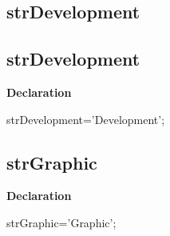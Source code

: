 \documentclass{report}
\newif\ifpdf
\begin{document}
\subsection*{\large{\textbf{strDevelopment}}\normalsize\hspace{1ex}\hrulefill}
\else
\subsection*{strDevelopment}
\fi
\label{trstrings-strDevelopment}
\begin{list}{}{
\setlength{\itemindent}{0cm}
\setlength{\listparindent}{0cm}
\setlength{\leftmargin}{\evensidemargin}
\addtolength{\leftmargin}{\tmplength}
\settowidth{\labelsep}{X}
\addtolength{\leftmargin}{\labelsep}
\setlength{\labelwidth}{\tmplength}
}
\item[\textbf{Declaration}\hfill]
\ifpdf
\begin{flushleft}
\fi
\begin{ttfamily}
strDevelopment='Development';\end{ttfamily}

\ifpdf
\end{flushleft}
\fi

\end{list}
\ifpdf
\subsection*{\large{\textbf{strGraphic}}\normalsize\hspace{1ex}\hrulefill}
\else
\subsection*{strGraphic}
\fi
\label{trstrings-strGraphic}
\begin{list}{}{
\setlength{\itemindent}{0cm}
\setlength{\listparindent}{0cm}
\setlength{\leftmargin}{\evensidemargin}
\addtolength{\leftmargin}{\tmplength}
\settowidth{\labelsep}{X}
\addtolength{\leftmargin}{\labelsep}
\setlength{\labelwidth}{\tmplength}
}
\item[\textbf{Declaration}\hfill]
\ifpdf
\begin{flushleft}
\fi
\begin{ttfamily}
strGraphic='Graphic';\end{ttfamily}

\ifpdf
\end{flushleft}
\fi

\end{list}
\ifpdf
\end{document}
